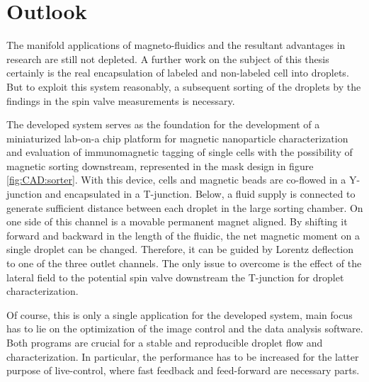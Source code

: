 \chapter{Outlook}
The manifold applications of magneto-fluidics and the resultant advantages in research are still not depleted. A further work on the subject of this thesis certainly is the real encapsulation of labeled and non-labeled cell into droplets. But to exploit this system reasonably, a subsequent sorting of the droplets by the findings in the spin valve measurements is necessary.

The developed system serves as the foundation for the development of a miniaturized lab-on-a chip platform for magnetic nanoparticle characterization and evaluation of immunomagnetic tagging of single cells with the possibility of magnetic sorting downstream, represented in the mask design in figure \ref{fig:CAD:sorter}. With this device, cells and magnetic beads are co-flowed in a Y-junction and encapsulated in a T-junction. Below, a fluid supply is connected to generate sufficient distance between each droplet in the large sorting chamber. On one side of this channel is a movable permanent magnet aligned. By shifting it forward and backward in the length of the fluidic, the net magnetic moment on a single droplet can be changed. Therefore, it can be guided by Lorentz deflection to one of the three outlet channels. The only issue to overcome is the effect of the lateral field to the potential spin valve downstream the T-junction for droplet characterization.

Of course, this is only a single application for the developed system, main focus has to lie on the optimization of the image control and the data analysis software. Both programs are crucial for a stable and reproducible droplet flow and characterization. In particular, the performance has to be increased for the latter purpose of live-control, where fast feedback and feed-forward are necessary parts.

